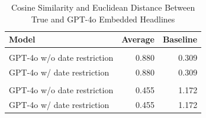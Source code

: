 \begin{table}[!h]
\centering
\caption{Cosine Similarity and Euclidean Distance Between True and GPT-4o Embedded Headlines}
\centering
\begin{tabular}[t]{lrr}
\toprule
Model & Average & Baseline\\
\midrule
\addlinespace[0.3em]
\multicolumn{3}{l}{\textit{Cosine Similarity}}\\
\hspace{1em}GPT-4o w/o date restriction & 0.880 & 0.309\\
\hspace{1em}GPT-4o w/ date restriction & 0.880 & 0.309\\
\midrule
\addlinespace[0.3em]
\multicolumn{3}{l}{\textit{Euclidean Distance}}\\
\hspace{1em}GPT-4o w/o date restriction & 0.455 & 1.172\\
\hspace{1em}GPT-4o w/ date restriction & 0.455 & 1.172\\
\bottomrule
\end{tabular}
\end{table}
